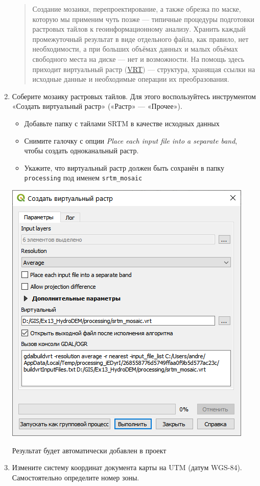 \documentclass[
  12pt,
]{book}
\begin{document}
\begin{enumerate}
  \begin{quote}
  Создание мозаики, перепроектирование, а также обрезка по маске, которую мы применим чуть позже --- типичные процедуры подготовки растровых тайлов к геоинформационному анализу. Хранить каждый промежуточный результат в виде отдельного файла, как правило, нет необходимости, а при больших объёмах данных и малых объёмах свободного места на диске --- нет и возможности. На помощь здесь приходит виртуальный растр (\href{https://gdal.org/drivers/raster/vrt.html}{VRT}) --- структура, хранящая ссылки на исходные данные и необходимые операции их преобразования.
  \end{quote}
\item
  Соберите мозаику растровых тайлов. Для этого воспользуйтесь инструментом «Создать виртуальный растр» («Растр» --- «Прочее»).

  \begin{itemize}
  \item
    Добавьте папку с тайлами SRTM в качестве исходных данных
  \item
    Снимите галочку с опции \emph{Place each input file into a separate band}, чтобы создать одноканальный растр.
  \item
    Укажите, что виртуальный растр должен быть сохранён в папку \texttt{processing} под именем \texttt{srtm\_mosaic}
  \end{itemize}

  \includegraphics{images/Ex13/mosaic.png}

  Результат будет автоматически добавлен в проект
\item
  Измените систему координат документа карты на UTM (датум WGS-84). Самостоятельно определите номер зоны.
\end{enumerate}
\end{document}

